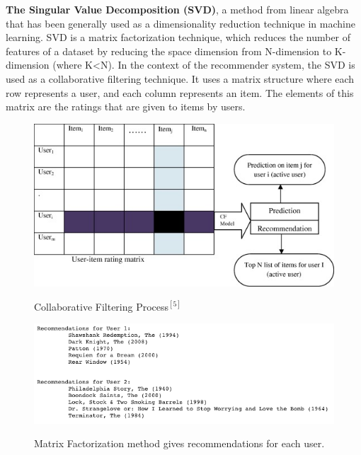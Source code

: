\documentclass[onecolumn]{article}
\begin{document}
\pagebreak
\textbf{The Singular Value Decomposition (SVD)}, a method from linear algebra that has been generally used as a dimensionality reduction technique in machine learning. SVD is a matrix factorization technique, which reduces the number of features of a dataset by reducing the space dimension from N-dimension to K-dimension (where K<N). In the context of the recommender system, the SVD is used as a collaborative filtering technique. It uses a matrix structure where each row represents a user, and each column represents an item. The elements of this matrix are the ratings that are given to items by users.

\hfill

\begin{figure}[h!t]
\centering
{\centering
    \includegraphics[width=0.8\linewidth]{figures/figure3.jpg}}        
\caption{Collaborative Filtering Process${^{[5]}}$}
\end{figure}

\hfill

\begin{figure}[h!t]
\centering
{\centering
    \includegraphics[width=14.1cm]{figures/result3.png}}        
\caption{Matrix Factorization method gives recommendations for each user.}
\end{figure}

\pagebreak
\end{document}
